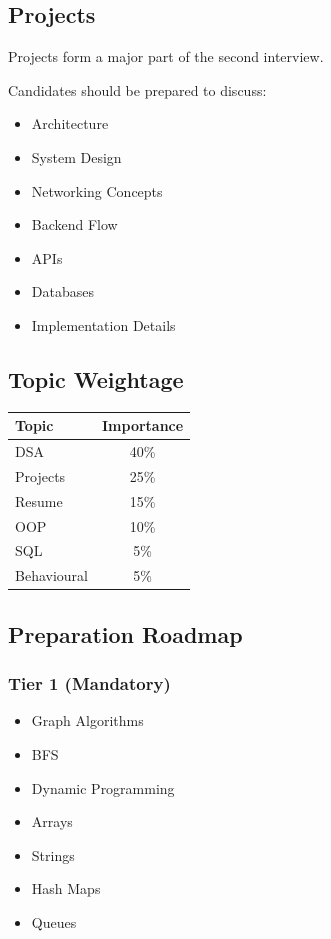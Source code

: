 \documentclass[11pt,a4paper]{article}
\begin{document}
\subsection{Projects}

Projects form a major part of the second interview.

Candidates should be prepared to discuss:

\begin{itemize}
	\item Architecture
	\item System Design
	\item Networking Concepts
	\item Backend Flow
	\item APIs
	\item Databases
	\item Implementation Details
\end{itemize}


\subsection{Topic Weightage}

\begin{center}
	\begin{tabular}{|l|c|}
		\hline
		Topic & Importance \\
		\hline
		DSA & 40\% \\
		Projects & 25\% \\
		Resume & 15\% \\
		OOP & 10\% \\
		SQL & 5\% \\
		Behavioural & 5\% \\
		\hline
	\end{tabular}
\end{center}


\subsection{Preparation Roadmap}

\subsubsection{Tier 1 (Mandatory)}

\begin{itemize}
	\item Graph Algorithms
	\item BFS
	\item Dynamic Programming
	\item Arrays
	\item Strings
	\item Hash Maps
	\item Queues
\end{itemize}
\end{document}
